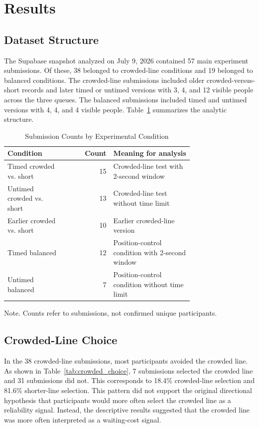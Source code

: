 \documentclass[stu,12pt,floatsintext]{apa7}
\begin{document}
\section{Results}

\subsection{Dataset Structure}

The Supabase snapshot analyzed on July 9, 2026 contained 57 main experiment submissions. Of these, 38 belonged to crowded-line conditions and 19 belonged to balanced conditions. The crowded-line submissions included older crowded-versus-short records and later timed or untimed versions with 3, 4, and 12 visible people across the three queues. The balanced submissions included timed and untimed versions with 4, 4, and 4 visible people. Table~\ref{tab:condition_counts} summarizes the analytic structure.

\begin{table}
\caption{Submission Counts by Experimental Condition}
\centering
\begin{tabular}{p{0.31\linewidth}rp{0.43\linewidth}}
\hline
Condition & Count & Meaning for analysis \\
\hline
Timed crowded vs. short & 15 & Crowded-line test with 2-second window \\
Untimed crowded vs. short & 13 & Crowded-line test without time limit \\
Earlier crowded vs. short & 10 & Earlier crowded-line version \\
Timed balanced & 12 & Position-control condition with 2-second window \\
Untimed balanced & 7 & Position-control condition without time limit \\
\hline
\end{tabular}
\smallskip
\noindent Note. Counts refer to submissions, not confirmed unique participants.
\label{tab:condition_counts}
\end{table}

\subsection{Crowded-Line Choice}

In the 38 crowded-line submissions, most participants avoided the crowded line. As shown in Table~\ref{tab:crowded_choice}, 7 submissions selected the crowded line and 31 submissions did not. This corresponds to 18.4\% crowded-line selection and 81.6\% shorter-line selection. This pattern did not support the original directional hypothesis that participants would more often select the crowded line as a reliability signal. Instead, the descriptive results suggested that the crowded line was more often interpreted as a waiting-cost signal.
\end{document}
